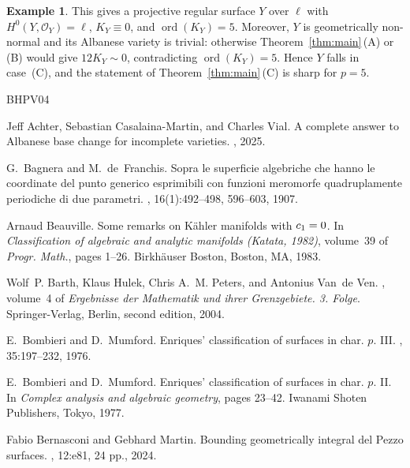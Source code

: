 \documentclass[10pt,abstract=true]{scrartcl}
\numberwithin{equation}{section}
\theoremstyle{definition}
\newtheorem{example}[theorem]{Example}
\theoremstyle{remark}
\DeclareMathOperator\ord{ord}
\begin{document}
\begin{example}
  \smallskip
  This gives a projective regular surface \(Y\) over \(\ell\) with \(H^0(Y,\mathcal O_Y)=\ell\), \(K_Y\equiv0\), and \(\ord(K_Y)=5\).
  Moreover, \(Y\) is geometrically non-normal and its Albanese variety is trivial: otherwise Theorem~\ref{thm:main}\,(A) or (B) would give \(12K_Y\sim0\), contradicting \(\ord(K_Y)=5\).
  Hence \(Y\) falls in case~(C), and the statement of Theorem~\ref{thm:main}\,(C) is sharp for \(p=5\).
\end{example}


% 
%  
\newcommand{\etalchar}[1]{$^{#1}$}
\begin{thebibliography}{BHPV04}
\small
\setlength{\itemsep}{1pt}
\setlength{\parsep}{0pt}
\setlength{\parskip}{0pt}

Jeff Achter, Sebastian Casalaina-Martin, and Charles Vial.
\newblock A complete answer to {A}lbanese base change for incomplete varieties.
, 2025.

G.~Bagnera and M.~de~Franchis.
\newblock Sopra le superficie algebriche che hanno le coordinate del punto generico esprimibili con funzioni meromorfe quadruplamente periodiche di due parametri.
, 16(1):492--498, 596--603, 1907.

Arnaud Beauville.
\newblock Some remarks on {K}\"ahler manifolds with {$c\sb{1}=0$}.
\newblock In {\em Classification of algebraic and analytic manifolds ({K}atata, 1982)}, volume~39 of {\em Progr. Math.}, pages 1--26. Birkh\"auser Boston, Boston, MA, 1983.

Wolf~P. Barth, Klaus Hulek, Chris A.~M. Peters, and Antonius Van~de Ven.
, volume~4 of {\em Ergebnisse der Mathematik und ihrer Grenzgebiete. 3. Folge}.
\newblock Springer-Verlag, Berlin, second edition, 2004.

E.~Bombieri and D.~Mumford.
\newblock Enriques' classification of surfaces in char. {$p$}. {III}.
, 35:197--232, 1976.

E.~Bombieri and D.~Mumford.
\newblock Enriques' classification of surfaces in char. {$p$}. {II}.
\newblock In {\em Complex analysis and algebraic geometry}, pages 23--42. Iwanami Shoten Publishers, Tokyo, 1977.

Fabio Bernasconi and Gebhard Martin.
\newblock Bounding geometrically integral del {Pezzo} surfaces.
, 12:e81, 24 pp., 2024.


\end{thebibliography}
\end{document}
